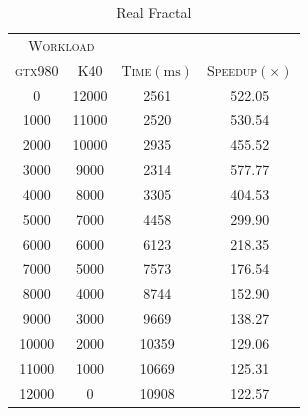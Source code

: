 \begin{table}[!htb]
    \small
    \caption[Timing and speedup for the fractal generation benchmark on a \texttt{K40} and a \texttt{GTX980}.]{Timing and speedups for the fractal generation (small dataset) on a\texttt{K40} and a \texttt{GTX980}. (a) and (b) are refereed to the real case  and the uniform work scenarios, respectively. The Best speed-up case is highlighted in dark gray. The workload columns indicate the amount of rows assigned to each device.}
    \label{tab:julia_two_GPU}
    \begin{subtable}{.5\linewidth}
        \centering
        \caption{Real Fractal}
        
        \begin{tabular}{@{}CCCC@{}}
            \toprule
            \\ 
            \textsc{gtx980}& \textsc{K40} & \textsc{Time}$(\si{\milli\second})$ & \textsc{Speedup$(\times)$}  \\\midrule
            0     & 12000 & 2561  & 522.05 \\
            1000  & 11000 & 2520  & 530.54 \\
            2000  & 10000 & 2935  & 455.52 \\
            3000  & 9000  & 2314  & 577.77 \\
            4000  & 8000  & 3305  & 404.53 \\
            5000  & 7000  & 4458  & 299.90 \\
            6000  & 6000  & 6123  & 218.35 \\
            7000  & 5000  & 7573  & 176.54 \\
            8000  & 4000  & 8744  & 152.90 \\
            9000  & 3000  & 9669  & 138.27 \\
            10000 & 2000  & 10359 & 129.06 \\
            11000 & 1000  & 10669 & 125.31 \\
            12000 & 0     & 10908 & 122.57\\

\end{tabular}
\end{subtable}
\end{table}
